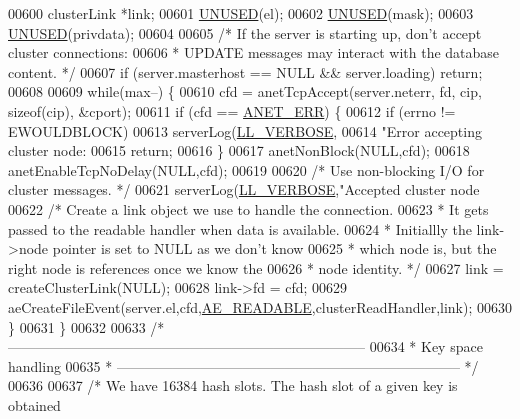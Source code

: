 \begin{DoxyCode}
{{{{{{{{{00600     clusterLink *link;
00601     \hyperlink{server_8h_ae7c9dc8f13568a9c856573751f1ee1ec}{UNUSED}(el);
00602     \hyperlink{server_8h_ae7c9dc8f13568a9c856573751f1ee1ec}{UNUSED}(mask);
00603     \hyperlink{server_8h_ae7c9dc8f13568a9c856573751f1ee1ec}{UNUSED}(privdata);
00604 
00605     \textcolor{comment}{/* If the server is starting up, don't accept cluster connections:}
00606 \textcolor{comment}{     * UPDATE messages may interact with the database content. */}
00607     \textcolor{keywordflow}{if} (server.masterhost == NULL && server.loading) \textcolor{keywordflow}{return};
00608 
00609     \textcolor{keywordflow}{while}(max--) \{
00610         cfd = anetTcpAccept(server.neterr, fd, cip, \textcolor{keyword}{sizeof}(cip), &cport);
00611         \textcolor{keywordflow}{if} (cfd == \hyperlink{anet_8h_a0697b7774a7e0f4ef141839fe93536fe}{ANET\_ERR}) \{
00612             \textcolor{keywordflow}{if} (errno != EWOULDBLOCK)
00613                 serverLog(\hyperlink{server_8h_a479b60032f8da6d8ad72e1a9d0809950}{LL\_VERBOSE},
00614                     \textcolor{stringliteral}{"Error accepting cluster node: %
00615             \textcolor{keywordflow}{return};
00616         \}
00617         anetNonBlock(NULL,cfd);
00618         anetEnableTcpNoDelay(NULL,cfd);
00619 
00620         \textcolor{comment}{/* Use non-blocking I/O for cluster messages. */}
00621         serverLog(\hyperlink{server_8h_a479b60032f8da6d8ad72e1a9d0809950}{LL\_VERBOSE},\textcolor{stringliteral}{"Accepted cluster node %
00622         \textcolor{comment}{/* Create a link object we use to handle the connection.}
00623 \textcolor{comment}{         * It gets passed to the readable handler when data is available.}
00624 \textcolor{comment}{         * Initiallly the link->node pointer is set to NULL as we don't know}
00625 \textcolor{comment}{         * which node is, but the right node is references once we know the}
00626 \textcolor{comment}{         * node identity. */}
00627         link = createClusterLink(NULL);
00628         link->fd = cfd;
00629         aeCreateFileEvent(server.el,cfd,\hyperlink{ae_8h_a7a9a2162d007d09739955b4e55c65bf3}{AE\_READABLE},clusterReadHandler,link);
00630     \}
00631 \}
00632 
00633 \textcolor{comment}{/* -----------------------------------------------------------------------------}
00634 \textcolor{comment}{ * Key space handling}
00635 \textcolor{comment}{ * -------------------------------------------------------------------------- */}
00636 
00637 \textcolor{comment}{/* We have 16384 hash slots. The hash slot of a given key is obtained}
}}}}}}}}}}}
\end{DoxyCode}
